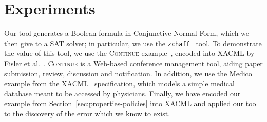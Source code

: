 \section{Experiments}
\label{sec:experiments}

Our tool generates a Boolean formula in Conjunctive Normal Form, which
we then give to a SAT solver; in particular, we use the
\texttt{zchaff}~\cite{moskewicz01chaff} tool.  To demonstrate the
value of this tool, we use the \textsc{Continue}
example~\cite{krishnamurthi03continue}, encoded into XACML by Fisler
et al.~\cite{fisler05}.  \textsc{Continue} is a Web-based conference
management tool, aiding paper submission, review, discussion and
notification.  In addition, we use the Medico example from the
XACML~\cite{xacml} specification, which models a simple medical
database meant to be accessed by physicians.  Finally, we have encoded
our example from Section~\ref{sec:properties-policies} into XACML and
applied our tool to the discovery of the error which we know to exist.

